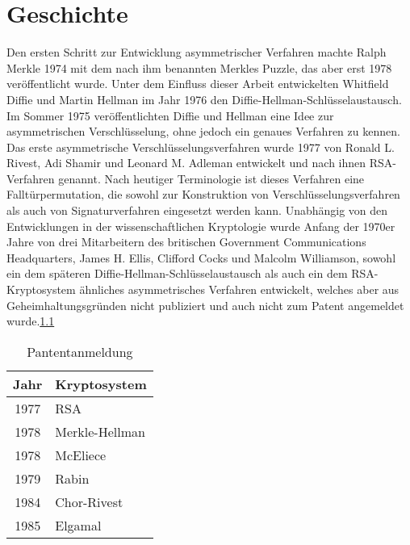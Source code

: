 
\chapter{Geschichte}
\label{chapter-geschichte}
Den ersten Schritt zur Entwicklung asymmetrischer Verfahren machte Ralph Merkle 1974 mit dem nach ihm benannten Merkles Puzzle, das aber erst 1978 veröffentlicht wurde. Unter dem Einfluss dieser Arbeit entwickelten Whitfield Diffie und Martin Hellman im Jahr 1976 den Diffie-Hellman-Schlüsselaustausch.\cite{ndic} Im Sommer 1975 veröffentlichten Diffie und Hellman eine Idee zur asymmetrischen Verschlüsselung, ohne jedoch ein genaues Verfahren zu kennen. Das erste asymmetrische Verschlüsselungsverfahren wurde 1977 von Ronald L. Rivest, Adi Shamir und Leonard M. Adleman entwickelt und nach ihnen RSA-Verfahren genannt. Nach heutiger Terminologie ist dieses Verfahren eine Falltürpermutation, die sowohl zur Konstruktion von Verschlüsselungsverfahren als auch von Signaturverfahren eingesetzt werden kann.
Unabhängig von den Entwicklungen in der wissenschaftlichen Kryptologie wurde Anfang der 1970er Jahre von drei Mitarbeitern des britischen Government Communications Headquarters, James H. Ellis, Clifford Cocks und Malcolm Williamson, sowohl ein dem späteren Diffie-Hellman-Schlüsselaustausch als auch ein dem RSA-Kryptosystem ähnliches asymmetrisches Verfahren entwickelt, welches aber aus Geheimhaltungsgründen nicht publiziert und auch nicht zum Patent angemeldet wurde.\ref{pa}
\begin{table} 
\caption{Pantentanmeldung}
\label{pa}
 \begin{tabular}{c|l}
  \rowcolor{gray!20}Jahr & Kryptosystem \\\hline
1977&	RSA\\
1978&	Merkle-Hellman\\
1978&	McEliece\\
1979&	Rabin\\
1984	&Chor-Rivest\\
1985&	Elgamal\\

 \end{tabular}
\end{table}